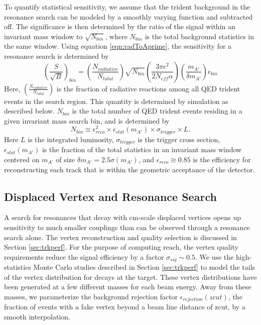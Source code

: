 To quantify statistical sensitivity, we assume that the trident background in the 
resonance search can be modeled by a smoothly varying function and subtracted off. 
The significance is then determined by the ratio of the signal within an invariant mass 
window to $\sqrt{N_{bin}}$, where $N_{bin}$ is the total background statistics in the 
same window. Using equation \ref{eqn:radToAprime}, the sensitivity for a resonance search is determined by
\begin{equation}
 \left({\frac{S} {\sqrt{B}}}\right)_{bin}=\left({\frac{N_{radiative}} {N_{total}}}\right) \sqrt{N_{bin}} 
\left({\frac{3\pi \epsilon^2} {2 N_{eff}\alpha}}\right)\left({\frac{m_{A'}} {\delta m_{A'}}}\right)
\epsilon_{bin}
\label{eqn:signifBumpHunt}
\end{equation}   
Here, $\left({\frac{N_{radiative}} {N_{total}}}\right)$ is the fraction of radiative reactions 
among all QED trident events in the search region. This quantity is determined by 
simulation as described below. $N_{bin}$ is the total number of QED trident events 
residing in a given invariant mass search bin, and is determined by
\begin{equation}
 N_{bin} \equiv \epsilon_{reco}^2 \times \epsilon_{stat}(m_{A'})
 \times \sigma_{trigger} \times L.
\end{equation}
Here $L$ is the integrated luminosity, $\sigma_{trigger}$ is the trigger cross section, 
$\epsilon_{stat} (m_{A'})$ is the fraction of the total statistics in an invariant 
mass window centered on $m_{A'}$ of size  $\delta m_{A'} =2.5 \sigma (m_{A'})$, 
and $\epsilon_{reco} \cong 0.85$ is the efficiency for reconstructing each track that is 
within the geometric acceptance of the detector. 

\subsection{Displaced Vertex and Resonance Search}

A search for resonances that decay with cm-scale displaced vertices opens up sensitivity 
to much smaller couplings than can be observed through a resonance search alone.  
The vertex reconstruction and quality selection is discussed in Section \ref{sec:trkperf}.   
For the purpose of computing reach, the vertex quality requirements 
reduce the signal efficiency by a factor  $\sigma_{sig}\sim 0.5$.  
We use the high-statistics Monte Carlo studies described in 
Section \ref{sec:trkperf} to model the tails of the vertex distribution for decays at the target.  
These vertex distributions have been generated at a few different masses for each beam energy. 
Away from  these masses, we parameterize the background rejection factor $\epsilon_{rejection} (zcut)$,
 the fraction of events with a fake vertex beyond a beam line distance of zcut, 
by a smooth interpolation.

